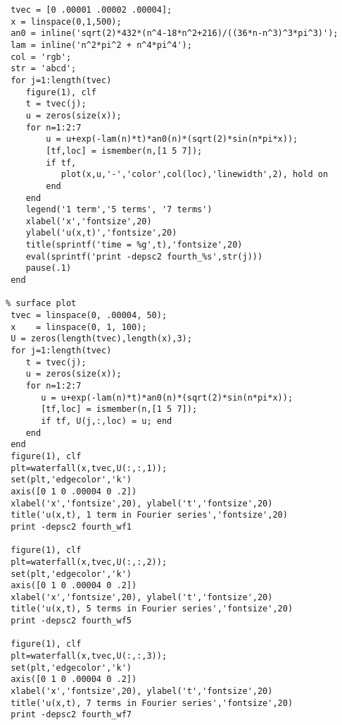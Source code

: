 {\footnotesize \begin{verbatim}
 tvec = [0 .00001 .00002 .00004];
 x = linspace(0,1,500);
 an0 = inline('sqrt(2)*432*(n^4-18*n^2+216)/((36*n-n^3)^3*pi^3)');
 lam = inline('n^2*pi^2 + n^4*pi^4');
 col = 'rgb';
 str = 'abcd';
 for j=1:length(tvec)
    figure(1), clf
    t = tvec(j);
    u = zeros(size(x));
    for n=1:2:7
        u = u+exp(-lam(n)*t)*an0(n)*(sqrt(2)*sin(n*pi*x));
        [tf,loc] = ismember(n,[1 5 7]);
        if tf, 
           plot(x,u,'-','color',col(loc),'linewidth',2), hold on
        end 
    end
    legend('1 term','5 terms', '7 terms')
    xlabel('x','fontsize',20)
    ylabel('u(x,t)','fontsize',20)
    title(sprintf('time = %g',t),'fontsize',20)
    eval(sprintf('print -depsc2 fourth_%s',str(j)))
    pause(.1)
 end

% surface plot
 tvec = linspace(0, .00004, 50);
 x    = linspace(0, 1, 100); 
 U = zeros(length(tvec),length(x),3);
 for j=1:length(tvec)
    t = tvec(j);
    u = zeros(size(x));
    for n=1:2:7
       u = u+exp(-lam(n)*t)*an0(n)*(sqrt(2)*sin(n*pi*x));
       [tf,loc] = ismember(n,[1 5 7]);
       if tf, U(j,:,loc) = u; end 
    end
 end
 figure(1), clf
 plt=waterfall(x,tvec,U(:,:,1));
 set(plt,'edgecolor','k')
 axis([0 1 0 .00004 0 .2])
 xlabel('x','fontsize',20), ylabel('t','fontsize',20)
 title('u(x,t), 1 term in Fourier series','fontsize',20)
 print -depsc2 fourth_wf1

 figure(1), clf
 plt=waterfall(x,tvec,U(:,:,2));
 set(plt,'edgecolor','k')
 axis([0 1 0 .00004 0 .2])
 xlabel('x','fontsize',20), ylabel('t','fontsize',20)
 title('u(x,t), 5 terms in Fourier series','fontsize',20)
 print -depsc2 fourth_wf5

 figure(1), clf
 plt=waterfall(x,tvec,U(:,:,3));
 set(plt,'edgecolor','k')
 axis([0 1 0 .00004 0 .2])
 xlabel('x','fontsize',20), ylabel('t','fontsize',20)
 title('u(x,t), 7 terms in Fourier series','fontsize',20)
 print -depsc2 fourth_wf7
\end{verbatim}}
